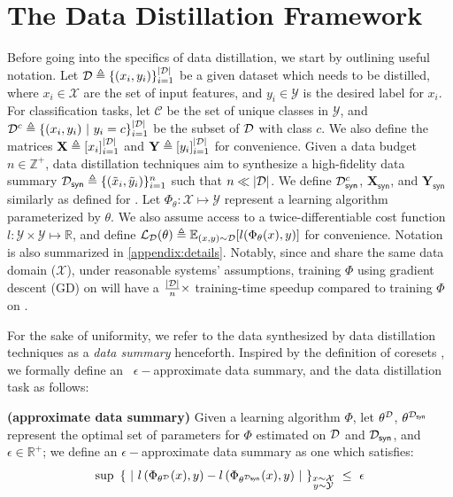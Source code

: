 \documentclass[10pt]{article} %
\begin{document}
\section{The Data Distillation Framework} \label{sec:framework}

Before going into the specifics of data distillation, we start by outlining useful notation. Let $\mathcal{D} \triangleq \{ (x_i, y_i) \}_{i=1}^{|\mathcal{D}|}$ be a given dataset which needs to be distilled, where $x_i \in \mathcal{X}$ are the set of input features, and $y_i \in \mathcal{Y}$ is the desired label for $x_i$. For classification tasks, let $\mathcal{C}$ be the set of unique classes in $\mathcal{Y}$, and $\mathcal{D}^c \triangleq \{ (x_i, y_i) ~|~ y_i = c\}_{i=1}^{|\mathcal{D}|}$ be the subset of $\mathcal{D}$ with class $c$. We also define the matrices $\mathbf{X} \triangleq [x_i]_{i=1}^{|\mathcal{D}|}$ and $\mathbf{Y} \triangleq [y_i]_{i=1}^{|\mathcal{D}|}$ for convenience. Given a data budget $n \in \mathbb{Z}^+$, data distillation techniques aim to synthesize a high-fidelity data summary $\mathcal{D}_{\mathsf{syn}} \triangleq \{ (\Tilde{x}_i, \Tilde{y}_i) \}_{i=1}^{n}$ such that $n \ll |\mathcal{D}|$. We define $\mathcal{D}_{\mathsf{syn}}^c$, $\mathbf{X}_{\mathsf{syn}}$, and $\mathbf{Y}_{\mathsf{syn}}$ similarly as defined for \dataset. Let $\Phi_{\theta} : \mathcal{X} \mapsto \mathcal{Y}$ represent a learning algorithm parameterized by $\theta$. We also assume access to a twice-differentiable cost function $l : \mathcal{Y} \times \mathcal{Y} \mapsto \mathbb{R}$, and define $\mathcal{L}_{\mathcal{D}}(\theta) \triangleq \mathbb{E}_{(x, y) \sim \mathcal{D}}[l(\Phi_{\theta}(x), y)]$ for convenience. Notation is also summarized in \cref{appendix:details}. Notably, since \dataset and \distill share the same data domain ($\mathcal{X}$), under reasonable systems' assumptions, training $\Phi$ using gradient descent (GD) on \distill will have a $\frac{|\mathcal{D}|}{n} \times$ training-time speedup compared to training $\Phi$ on \dataset. 

For the sake of uniformity, we refer to the data synthesized by data distillation techniques as a \emph{data summary} henceforth. Inspired by the definition of coresets \citep{coreset_general}, we formally define an \ $\epsilon-$approximate data summary, and the data distillation task as follows:

\begin{mydefinition} \label{def:data_quality}
    {\normalfont \textbf{(\boldmath{$\epsilon-$}approximate data summary)}} Given a learning algorithm $\Phi$, let $\theta^{\mathcal{D}}$, $\theta^{\mathcal{D}_{\mathsf{syn}}}$ represent the optimal set of parameters for $\Phi$ estimated on $\mathcal{D}$ and $\mathcal{D}_{\mathsf{syn}}$, and $\epsilon \in \mathbb{R}^+$; we define an $\epsilon-$approximate data summary as one which satisfies:
    \begin{equation} \label{eqn:eps_approx_summary}
        \operatorname{sup} ~ \left\{ ~ \left\vert \ l\left(\Phi_{\theta^{\dataset}}(x), y\right) - l\left(\Phi_{\theta^{\distill}}(x), y\right) \ \right\vert ~ \right\}_{\raisebox{6pt}{$\substack{x \sim \mathcal{X}\\y \sim \mathcal{Y}}$}} ~ \leq ~ \epsilon
    \end{equation}
\end{mydefinition}
\end{document}
